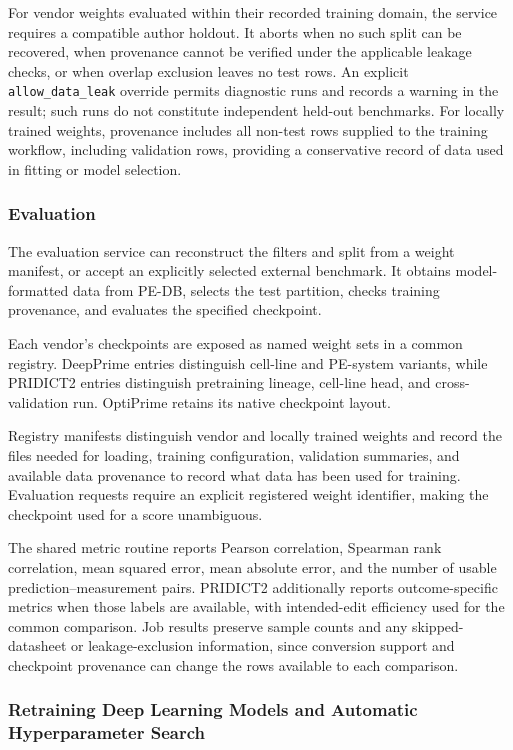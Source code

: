 \documentclass{article}
\begin{document}
For vendor weights evaluated within their recorded training domain, the service requires a compatible author holdout. It aborts when no such split can be recovered, when provenance cannot be verified under the applicable leakage checks, or when overlap exclusion leaves no test rows. An explicit \nolinkurl{allow_data_leak} override permits diagnostic runs and records a warning in the result; such runs do not constitute independent held-out benchmarks. For locally trained weights, provenance includes all non-test rows supplied to the training workflow, including validation rows, providing a conservative record of data used in fitting or model selection.

\subsubsection{Evaluation}

The evaluation service can reconstruct the filters and split from a weight manifest, or accept an explicitly selected external benchmark. It obtains model-formatted data from PE-DB, selects the test partition, checks training provenance, and evaluates the specified checkpoint. 

Each vendor's checkpoints are exposed as named weight sets in a common registry. DeepPrime entries distinguish cell-line and PE-system variants, while PRIDICT2 entries distinguish pretraining lineage, cell-line head, and cross-validation run. OptiPrime retains its native checkpoint layout. 

Registry manifests distinguish vendor and locally trained weights and record the files needed for loading, training configuration, validation summaries, and available data provenance to record what data has been used for training. Evaluation requests require an explicit registered weight identifier, making the checkpoint used for a score unambiguous.

The shared metric routine reports Pearson correlation, Spearman rank correlation, mean squared error, mean absolute error, and the number of usable prediction--measurement pairs. PRIDICT2 additionally reports outcome-specific metrics when those labels are available, with intended-edit efficiency used for the common comparison. Job results preserve sample counts and any skipped-datasheet or leakage-exclusion information, since conversion support and checkpoint provenance can change the rows available to each comparison.

\subsubsection{Retraining Deep Learning Models and Automatic Hyperparameter Search}
\end{document}
